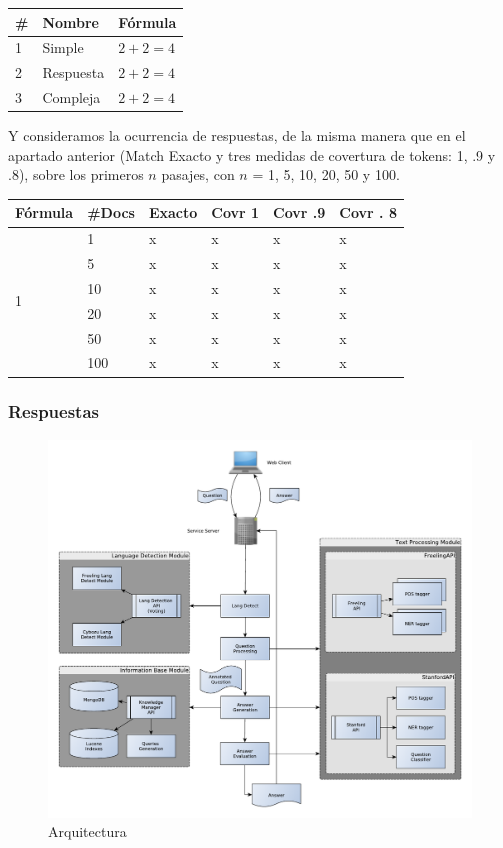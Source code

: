 \begin{center}
\begin{tabular}{|l|l|l|}
\hline
\#& Nombre & Fórmula \\ \hline
1& Simple & $2+2=4$ \\ \hline
2& Respuesta & $2+2=4$ \\ \hline
3& Compleja & $2+2=4$ \\ \hline
\end{tabular}
\end{center}

Y consideramos la ocurrencia de respuestas, de la misma manera que en el apartado anterior (Match Exacto y tres medidas de covertura de tokens: 1, .9 y .8), 
sobre los primeros $n$ pasajes, con $n$ = 1, 5, 10, 20, 50 y 100.

\begin{center}
\begin{tabular}{|l|l|l|l|l|l|}
\hline
Fórmula & \#Docs & Exacto & Covr 1 & Covr .9 & Covr . 8 \\ \hline
\multirow{6}{*}{1} & 1 & x & x & x & x \\  \cline{2-6}
 & 5 & x & x & x & x \\ \cline{2-6}
 & 10 & x & x & x & x \\ \cline{2-6}
 & 20 & x & x & x & x \\ \cline{2-6}
 & 50 & x & x & x & x \\ \cline{2-6}
 & 100 & x & x & x & x \\ \hline
\end{tabular}
\end{center}


\subsubsection{Respuestas}





\begin{figure}
  \centering
    \includegraphics[scale=0.86]{graficos/Architecture}
  \caption{Arquitectura}
  \label{fig:Architecture}
\end{figure}

%
